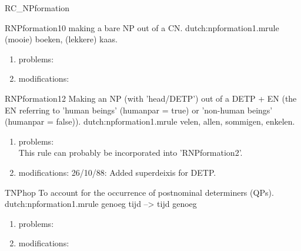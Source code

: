 \begin{mruleclass}{RC_NPformation}
\begin{members}
\begin{member}
\begin{enumerate}
\begin{enumerate}
\end{enumerate}

\end{member}
\begin{member}
 RNPformation10
 making a bare NP out of a  CN.
\file dutch:npformation1.mrule
\semantics \nosemantics
\example (mooie) boeken, (lekkere) kaas.
\remarks\mbox{}
\begin{enumerate}
\item problems:\\

\item modifications:\\

\end{enumerate}

\end{member}
\begin{member}
 RNPformation12
 Making an NP (with 'head/DETP') out of a DETP + EN 
(the EN referring to 'human beings' (humanpar = true) or 'non-human beings' 
(humanpar = false)).
\file dutch:npformation1.mrule
\semantics \nosemantics
\example velen, allen, sommigen, enkelen.
\remarks\mbox{}
\begin{enumerate}
\item problems:\\
This rule can probably be incorporated into 'RNPformation2'.
\item modifications: 26/10/88: Added superdeixis for DETP.\\

\end{enumerate}

\end{member}
\begin{member}
 TNPhop
 To account for the occurrence of postnominal determiners (QPs).
\file dutch:npformation1.mrule
\semantics \nosemantics
\example genoeg tijd --> tijd genoeg
\remarks\mbox{}
\begin{enumerate}
\item problems:\\

\item modifications:\\

\end{enumerate}

\end{member}
\end{members}

\nofilters

\nospeedrules

\noplannedrules

\norulesnotince

\begin{comments}
\end{comments}

\end{mruleclass}



